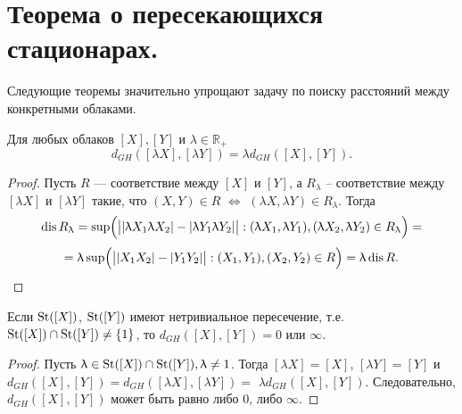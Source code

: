 
\section{Теорема о пересекающихся стационарах.}


Следующие теоремы значительно упрощают задачу по поиску расстояний между конкретными облаками.
\begin{theorem}
	Для любых облаков $[X], [Y]$ и $\lambda \in \mathbb{R}_+$ $$d_{GH}([\lambda X], [\lambda Y]) = \lambda d_{GH}([X], [Y]).$$
\end{theorem}
\begin{proof}
Пусть $R$ --- соответствие между $[X]$ и $[Y]$, а $R_\lambda$ -- соответствие между $[\lambda X]$ и $[\lambda Y]$ такие, что $(X, Y)\in R$ $\Leftrightarrow$ $(\lambda X, \lambda Y) \in R_\lambda$. Тогда\\ $$\operatorname{dis}{R_{\uplambda}} = \sup\Bigl(\big||\uplambda X_1 \uplambda X_2| - |\uplambda Y_1 \uplambda Y_2|\big| : (\uplambda X_1, \uplambda Y_1), (\uplambda X_2, \uplambda Y_2) \in R_{\uplambda} \Bigr) =$$ $$=  \uplambda \sup\Bigl(\big||X_1 X_2| - |Y_1 Y_2|\big| : (X_1, Y_1), (X_2, Y_2)\in R\Bigr) = \uplambda \operatorname{dis}{R}.$$ 
\end{proof}

\begin{corollary*}
	Если $\operatorname{St}([X])$, $\operatorname{St}([Y])$ имеют нетривиальное пересечение, т.е. $\operatorname{St}([X])\cap \operatorname{St}([Y]) \neq \{1\}$, то $d_{GH}([X], [Y]) = 0$ или $\infty$.
\end{corollary*}
\begin{proof}
	         Пусть $\uplambda \in \operatorname{St}([X])\cap \operatorname{St}([Y]), \uplambda \neq 1$. Тогда $[\lambda X] = [X]$, $[\lambda Y] = [Y]$ и $d_{GH}([X], [Y]) = d_{GH}([\lambda X], [\lambda Y]) =$ $ \lambda d_{GH}([X], [Y])$. Следовательно, $d_{GH}([X], [Y])$ может быть равно либо $0$, либо $\infty$.
\end{proof}

